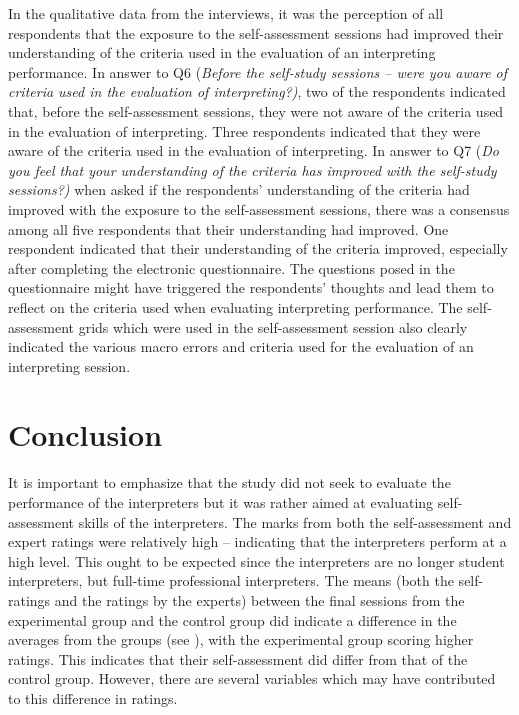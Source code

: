 \documentclass[output=paper]{langsci/langscibook}
\begin{document}
In the qualitative data from the interviews, it was the perception of all respondents that the exposure to the self-assessment sessions had improved their understanding of the criteria used in the evaluation of an interpreting performance. In answer to Q6 (\textit{Before the self-study sessions – were you aware of criteria used in the evaluation of interpreting?)}, two of the respondents indicated that, before the self-assessment sessions, they were not aware of the criteria used in the evaluation of interpreting. Three respondents indicated that they were aware of the criteria used in the evaluation of interpreting. In answer to Q7 (\textit{Do you feel that your understanding of the criteria has improved with the self-study sessions?)} when asked if the respondents’ understanding of the criteria had improved with the exposure to the self-assessment sessions, there was a consensus among all five respondents that their understanding had improved. One respondent indicated that their understanding of the criteria improved, especially after completing the electronic questionnaire. The questions posed in the questionnaire might have triggered the respondents’ thoughts and lead them to reflect on the criteria used when evaluating interpreting performance. The self-assessment grids which were used in the self-assessment session also clearly indicated the various macro errors and criteria used for the evaluation of an interpreting session. 

\section{Conclusion}

It is important to emphasize that the study did not seek to evaluate the performance of the interpreters but it was rather aimed at evaluating self-assessment skills of the interpreters. The marks from both the self-assessment and expert ratings were relatively high --  indicating that the interpreters perform at a high level. This ought to be expected since the interpreters are no longer student interpreters, but full-time professional interpreters. The means (both the self-ratings and the ratings by the experts) between the final sessions from the experimental group and the control group did indicate a difference in the averages from the groups (see ), with the experimental group scoring higher ratings. This indicates that their self-assessment did differ from that of the control group. However, there are several variables which may have contributed to this difference in ratings.  
\end{document}
